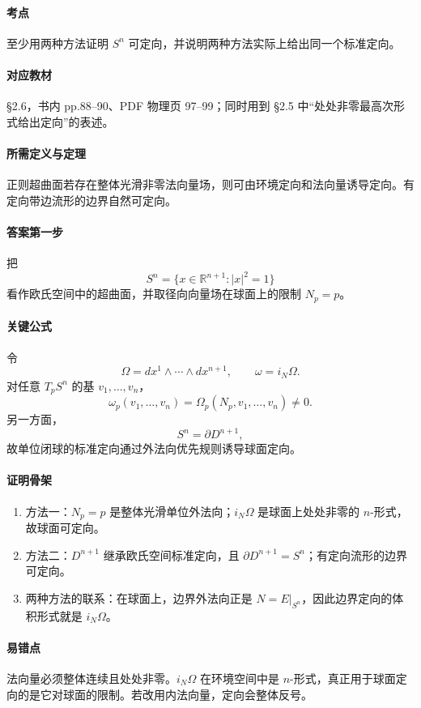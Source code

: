\documentclass[12pt,a4paper]{ctexart}
\newcommand{\R}{\mathbb R}
\begin{document}
\paragraph{考点}
至少用两种方法证明 $S^n$ 可定向，并说明两种方法实际上给出同一个标准定向。

\paragraph{对应教材}
\S 2.6，书内 pp.88--90、PDF 物理页 97--99；同时用到 \S 2.5 中“处处非零最高次形式给出定向”的表述。

\paragraph{所需定义与定理}
正则超曲面若存在整体光滑非零法向量场，则可由环境定向和法向量诱导定向。有定向带边流形的边界自然可定向。

\paragraph{答案第一步}
把
\[
  S^n=\{x\in\R^{n+1}:|x|^2=1\}
\]
看作欧氏空间中的超曲面，并取径向向量场在球面上的限制 $N_p=p$。

\paragraph{关键公式}
令
\[
  \Omega=dx^1\wedge\cdots\wedge dx^{n+1},\qquad
  \omega=i_N\Omega.
\]
对任意 $T_pS^n$ 的基 $v_1,\ldots,v_n$，
\[
  \omega_p(v_1,\ldots,v_n)=\Omega_p(N_p,v_1,\ldots,v_n)\ne0.
\]
另一方面，
\[
  S^n=\partial D^{n+1},
\]
故单位闭球的标准定向通过外法向优先规则诱导球面定向。

\paragraph{证明骨架}
\begin{enumerate}
  \item 方法一：$N_p=p$ 是整体光滑单位外法向；$i_N\Omega$ 是球面上处处非零的 $n$-形式，故球面可定向。
  \item 方法二：$D^{n+1}$ 继承欧氏空间标准定向，且 $\partial D^{n+1}=S^n$；有定向流形的边界可定向。
  \item 两种方法的联系：在球面上，边界外法向正是 $N=E|_{S^n}$，因此边界定向的体积形式就是 $i_N\Omega$。
\end{enumerate}

\paragraph{易错点}
法向量必须整体连续且处处非零。$i_N\Omega$ 在环境空间中是 $n$-形式，真正用于球面定向的是它对球面的限制。若改用内法向量，定向会整体反号。
\end{document}
